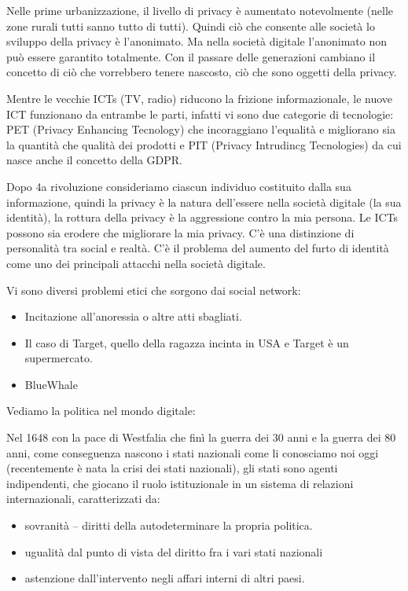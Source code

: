 \documentclass[a4page, 11pt]{article}
\begin{document}
Nelle prime urbanizzazione, il livello di privacy è aumentato
notevolmente (nelle zone rurali tutti sanno tutto di tutti). Quindi ciò
che consente alle società lo sviluppo della privacy è l'anonimato. Ma
nella società digitale l'anonimato non può essere garantito totalmente.
Con il passare delle generazioni cambiano il concetto di ciò che
vorrebbero tenere nascosto, ciò che sono oggetti della privacy.

Mentre le vecchie ICTs (TV, radio) riducono la frizione informazionale,
le nuove ICT funzionano da entrambe le parti, infatti vi sono due
categorie di tecnologie: PET (Privacy Enhancing Tecnology) che
incoraggiano l'equalità e migliorano sia la quantità che qualità dei
prodotti e PIT (Privacy Intrudincg Tecnologies) da cui nasce anche il
concetto della GDPR.

Dopo 4a rivoluzione consideriamo ciascun individuo costituito dalla sua
informazione, quindi la privacy è la natura dell'essere nella società
digitale (la sua identità), la rottura della privacy è la aggressione
contro la mia persona. Le ICTs possono sia erodere che migliorare la mia
privacy. C'è una distinzione di personalità tra social e realtà. C'è il
problema del aumento del furto di identità come uno dei principali
attacchi nella società digitale.

Vi sono diversi problemi etici che sorgono dai social network:

\begin{itemize}
	 
	\item
	Incitazione all'anoressia o altre atti sbagliati.
	\item
	Il caso di Target, quello della ragazza incinta in USA e Target è un
	supermercato.
	\item
	BlueWhale
\end{itemize}

Vediamo la politica nel mondo digitale:

Nel 1648 con la pace di Westfalia che finì la guerra dei 30 anni e la
guerra dei 80 anni, come conseguenza nascono i stati nazionali come li
conosciamo noi oggi (recentemente è nata la crisi dei stati nazionali),
gli stati sono agenti indipendenti, che giocano il ruolo istituzionale
in un sistema di relazioni internazionali, caratterizzati da:

\begin{itemize}
	 
	\item
	sovranità -- diritti della autodeterminare la propria politica.
	\item
	ugualità dal punto di vista del diritto fra i vari stati nazionali
	\item
	astenzione dall'intervento negli affari interni di altri paesi.
\end{itemize}
\end{document}
